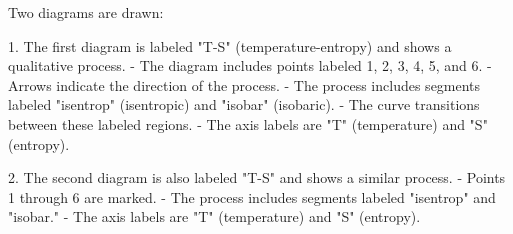 Two diagrams are drawn:  

1. The first diagram is labeled "T-S" (temperature-entropy) and shows a qualitative process.  
   - The diagram includes points labeled 1, 2, 3, 4, 5, and 6.  
   - Arrows indicate the direction of the process.  
   - The process includes segments labeled "isentrop" (isentropic) and "isobar" (isobaric).  
   - The curve transitions between these labeled regions.  
   - The axis labels are "T" (temperature) and "S" (entropy).  

2. The second diagram is also labeled "T-S" and shows a similar process.  
   - Points 1 through 6 are marked.  
   - The process includes segments labeled "isentrop" and "isobar."  
   - The axis labels are "T" (temperature) and "S" (entropy).